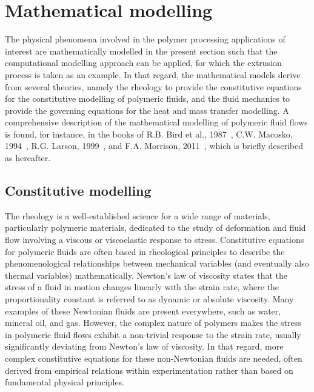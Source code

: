 \section{Mathematical modelling}
\label{chap1:sec:mathematical_modelling}

The physical phenomena involved in the polymer processing applications of interest are mathematically modelled in the present section such that the computational modelling approach can be applied, for which the extrusion process is taken as an example.
In that regard, the mathematical models derive from several theories, namely the rheology to provide the constitutive equations for the constitutive modelling of polymeric fluids, and the fluid mechanics to provide the governing equations for the heat and mass transfer modelling.
A comprehensive description of the mathematical modelling of polymeric fluid flows is found, for instance, in the books of R.B. Bird et al., 1987~\cite{chap1:1987bird}, C.W. Macosko, 1994~\cite{chap1:1994macosko}, R.G. Larson, 1999~\cite{chap1:1999larson}, and F.A. Morrison, 2011~\cite{chap1:2001morrison}, which is briefly described as hereafter.

\subsection{Constitutive modelling}
\label{chap1:subsec:computational_modelling_rheology_modelling}

The rheology is a well-established science for a wide range of materials, particularly polymeric materials, dedicated to the study of deformation and fluid flow involving a viscous or viscoelastic response to stress.
Constitutive equations for polymeric fluids are often based in rheological principles to describe the phenomenological relationships between mechanical variables (and eventually also thermal variables) mathematically.
Newton's law of viscosity states that the stress of a fluid in motion changes linearly with the strain rate, where the proportionality constant is referred to as dynamic or absolute viscosity.
Many examples of these Newtonian fluids are present everywhere, such as water, mineral oil, and gas.
However, the complex nature of polymers makes the stress in polymeric fluid flows exhibit a non-trivial response to the strain rate, usually significantly deviating from Newton's law of viscosity.
In that regard, more complex constitutive equations for these non-Newtonian fluids are needed, often derived from empirical relations within experimentation rather than based on fundamental physical principles.

